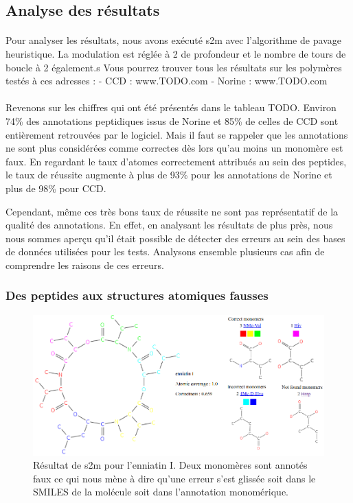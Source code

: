 \documentclass[12pt,french,twoside]{report}
\begin{document}
\subsection{Analyse des résultats}

\paragraph{}Pour analyser les résultats, nous avons exécuté s2m avec l'algorithme de pavage heuristique.
La modulation est réglée à 2 de profondeur et le nombre de tours de boucle à 2 également.s
Vous pourrez trouver tous les résultats sur les polymères testés à ces adresses :
- CCD : www.TODO.com
- Norine : www.TODO.com


\paragraph{}Revenons sur les chiffres qui ont été présentés dans le tableau TODO.
Environ 74\% des annotations peptidiques issus de Norine et 85\% de celles de CCD sont entièrement retrouvées par le logiciel.
Mais il faut se rappeler que les annotations ne sont plus considérées comme correctes dès lors qu'au moins un monomère est faux.
En regardant le taux d'atomes correctement attribués au sein des peptides, le taux de réussite augmente à plus de 93\% pour les annotations de Norine et plus de 98\% pour CCD.

Cependant, même ces très bons taux de réussite ne sont pas représentatif de la qualité des annotations.
En effet, en analysant les résultats de plus près, nous nous sommes aperçu qu'il était possible de détecter des erreurs au sein des bases de données utilisées pour les tests.
Analysons ensemble plusieurs cas afin de comprendre les raisons de ces erreurs.


\subsubsection{Des peptides aux structures atomiques fausses}

\begin{figure}[!ht]
  \begin{center}
    \includegraphics[width=450px]{Figures/s2m/results/s2m_enniati.png}
    \caption{\label{s2m_enniati}Résultat de s2m pour l'enniatin I.
    Deux monomères sont annotés faux ce qui nous mène à dire qu'une erreur s'est glissée soit dans le SMILES de la molécule soit dans l'annotation monomérique.}
  \end{center}
\end{figure}
\end{document}
